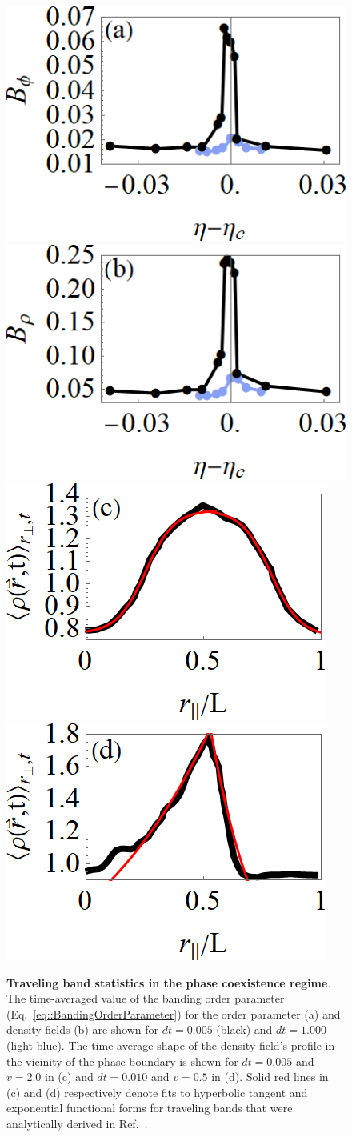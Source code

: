 \documentclass[twoside,twocolumn,9pt]{article}
\begin{document}
\begin{figure}[h]
	\centering
	\includegraphics[width=0.49\columnwidth]{B_phi.png}
	\includegraphics[width=0.49\columnwidth]{B_rho.png}
	\includegraphics[width=0.49\columnwidth]{profile_phaseseparated.png}
	\includegraphics[width=0.49\columnwidth]{profile_soliton.png}
	\caption{\textbf{Traveling band statistics in the phase coexistence regime}.
		The time-averaged value of the banding order parameter (Eq.~\ref{eq::BandingOrderParameter}) for the order parameter (a) and density fields (b) are shown for $dt = 0.005$ (black) and $dt=1.000$ (light blue).
		The time-average shape of the density field's profile in the vicinity of the phase boundary is shown for $dt=0.005$ and $v=2.0$ in (c) and $dt=0.010$ and $v=0.5$ in (d). Solid red lines in (c) and (d) respectively denote fits to hyperbolic tangent and exponential functional forms for traveling bands that were analytically derived in Ref.~\cite{solon2015pattern}.
	}
	\label{fig:BandingProfiles}
\end{figure}
\end{document}
